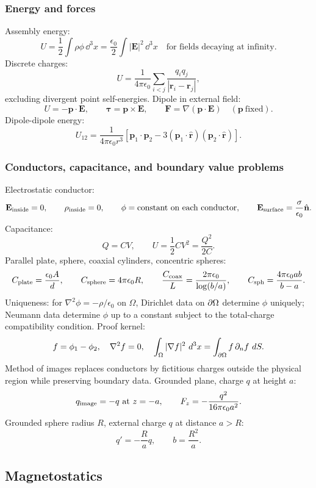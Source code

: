 \subsubsection*{Energy and forces}
Assembly energy:
\[
U=\frac12\int\rho\phi\,\dd^3x
=\frac{\epsilon_0}{2}\int |\mathbf E|^2\,\dd^3x
\quad\text{for fields decaying at infinity}.
\]
Discrete charges:
\[
U=\frac{1}{4\pi\epsilon_0}\sum_{i<j}\frac{q_iq_j}{|\mathbf r_i-\mathbf r_j|},
\]
excluding divergent point self-energies. Dipole in external field:
\[
U=-\mathbf p\cdot\mathbf E,\qquad
\boldsymbol\tau=\mathbf p\times\mathbf E,\qquad
\mathbf F=\nabla(\mathbf p\cdot\mathbf E)\quad(\mathbf p\ \text{fixed}).
\]
Dipole-dipole energy:
\[
U_{12}=\frac{1}{4\pi\epsilon_0r^3}
\left[\mathbf p_1\cdot\mathbf p_2-3(\mathbf p_1\cdot\hat{\mathbf r})
(\mathbf p_2\cdot\hat{\mathbf r})\right].
\]

\subsubsection*{Conductors, capacitance, and boundary value problems}
Electrostatic conductor:
\[
\mathbf E_{\rm inside}=0,\qquad \rho_{\rm inside}=0,\qquad
\phi=\text{constant on each conductor},\qquad
\mathbf E_{\rm surface}=\frac{\sigma}{\epsilon_0}\hat{\mathbf n}.
\]
Capacitance:
\[
Q=CV,\qquad U=\frac12 CV^2=\frac{Q^2}{2C}.
\]
Parallel plate, sphere, coaxial cylinders, concentric spheres:
\[
C_{\rm plate}=\frac{\epsilon_0A}{d},\qquad
C_{\rm sphere}=4\pi\epsilon_0R,\qquad
\frac{C_{\rm coax}}{L}=\frac{2\pi\epsilon_0}{\log(b/a)},\qquad
C_{\rm sph}=\frac{4\pi\epsilon_0ab}{b-a}.
\]
Uniqueness: for $\nabla^2\phi=-\rho/\epsilon_0$ on $\Omega$, Dirichlet data on
$\partial\Omega$ determine $\phi$ uniquely; Neumann data determine $\phi$ up to a constant
subject to the total-charge compatibility condition. Proof kernel:
\[
f=\phi_1-\phi_2,\quad \nabla^2f=0,\quad
\int_\Omega|\nabla f|^2\,\,d^3x=\int_{\partial\Omega}f\,\partial_nf\,\,d S.
\]
Method of images replaces conductors by fictitious charges outside the physical region
while preserving boundary data. Grounded plane, charge $q$ at height $a$:
\[
q_{\rm image}=-q\ \text{at }z=-a,\qquad
F_z=-\frac{q^2}{16\pi\epsilon_0a^2}.
\]
Grounded sphere radius $R$, external charge $q$ at distance $a>R$:
\[
q'=-\frac{R}{a}q,\qquad b=\frac{R^2}{a}.
\]

\subsection{Magnetostatics}

